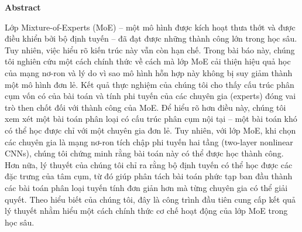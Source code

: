 
\begin{center}
    {\fontsize{14pt}{10pt}\selectfont \bfseries Abstract}
\end{center}
\vspace{-1em} %

Lớp Mixture-of-Experts (MoE) – một mô hình được kích hoạt thưa thớt và được điều khiển bởi bộ định tuyến – đã đạt được những thành công lớn trong học sâu. Tuy nhiên, việc hiểu rõ kiến trúc này vẫn còn hạn chế. Trong bài báo này, chúng tôi nghiên cứu một cách chính thức về cách mà lớp MoE cải thiện hiệu quả học của mạng nơ-ron và lý do vì sao mô hình hỗn hợp này không bị suy giảm thành một mô hình đơn lẻ. Kết quả thực nghiệm của chúng tôi cho thấy cấu trúc phân cụm vốn có của bài toán và tính phi tuyến của các chuyên gia (experts) đóng vai trò then chốt đối với thành công của MoE. Để hiểu rõ hơn điều này, chúng tôi xem xét một bài toán phân loại có cấu trúc phân cụm nội tại – một bài toán khó có thể học được chỉ với một chuyên gia đơn lẻ. Tuy nhiên, với lớp MoE, khi chọn các chuyên gia là mạng nơ-ron tích chập phi tuyến hai tầng (two-layer nonlinear CNNs), chúng tôi chứng minh rằng bài toán này có thể được học thành công. Hơn nữa, lý thuyết của chúng tôi chỉ ra rằng bộ định tuyến có thể học được các đặc trưng của tâm cụm, từ đó giúp phân tách bài toán phức tạp ban đầu thành các bài toán phân loại tuyến tính đơn giản hơn mà từng chuyên gia có thể giải quyết. Theo hiểu biết của chúng tôi, đây là công trình đầu tiên cung cấp kết quả lý thuyết nhằm hiểu một cách chính thức cơ chế hoạt động của lớp MoE trong học sâu.

